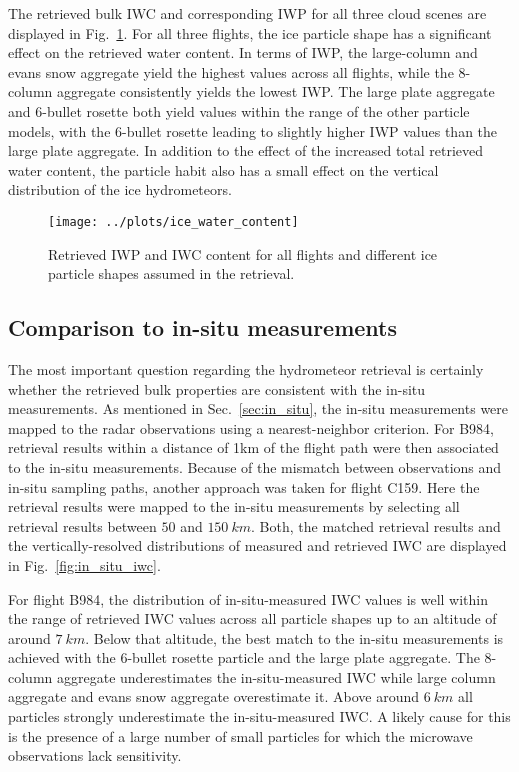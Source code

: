 \documentclass[journal abbreviation, manuscript]{copernicus}
\begin{document}
The retrieved bulk IWC and corresponding IWP for all three cloud scenes are
displayed in Fig.~\ref{fig:ice_water_content}. For all three flights, the ice
particle shape has a significant effect on the retrieved water content. In terms
of IWP, the large-column and evans snow aggregate yield the highest values
across all flights, while the 8-column aggregate consistently yields the lowest
IWP. The large plate aggregate and 6-bullet rosette both yield values within the
range of the other particle models, with the 6-bullet rosette leading to
slightly higher IWP values than the large plate aggregate. In addition to the
effect of the increased total retrieved water content, the particle habit also
has a small effect on the vertical distribution of the ice hydrometeors.


\begin{figure}[!hbpt]
  \centering
  \texttt{[image: ../plots/ice\_water\_content]}
  \caption{Retrieved IWP and IWC content for all flights and
    different ice particle shapes assumed in the retrieval.}
  \label{fig:ice_water_content}
\end{figure}

\subsection{Comparison to in-situ measurements}

The most important question regarding the hydrometeor retrieval is certainly
whether the retrieved bulk properties are consistent with the in-situ
measurements. As mentioned in Sec.~\ref{sec:in_situ}, the in-situ measurements
were mapped to the radar observations using a nearest-neighbor criterion. For
B984, retrieval results within a distance of 1km of the flight path were then
associated to the in-situ measurements. Because of the mismatch between
observations and in-situ sampling paths, another approach was taken for flight
C159. Here the retrieval results were mapped to the in-situ measurements by
selecting all retrieval results between $50$ and $150\ \unit{km}$. Both,
the matched retrieval results and the vertically-resolved distributions of
measured and retrieved IWC are displayed in Fig.~\ref{fig:in_situ_iwc}.

For flight B984, the distribution of in-situ-measured IWC values is well
within the range of retrieved IWC values across all particle shapes up
to an altitude of around $7\ \unit{km}$. Below that altitude, the best
match to the in-situ measurements is achieved with the 6-bullet rosette
particle and the large plate aggregate. The 8-column aggregate underestimates
the in-situ-measured IWC while large column aggregate and evans snow aggregate
overestimate it. Above around $6\ \unit{km}$ all particles strongly
underestimate the in-situ-measured IWC. A likely cause for this is the
presence of a large number of small particles for which the microwave
observations lack sensitivity.
\end{document}
